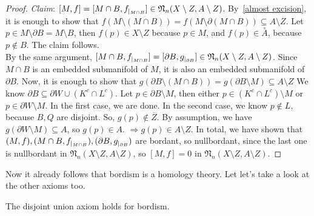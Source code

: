 \documentclass[a4paper,11pt]{article}
\begin{document}
\begin{proof}
    \textit{Claim}: \([M,f]=[M\cap B,f_{|_{M\cap B}}]\in\mathfrak{N}_n(X\setminus Z,A\setminus Z)\). By\ \ref{almost excision}, it is enough to show that \(f(M\setminus(M\cap B))=f(M\setminus \partial(M\cap B))\subseteq A\setminus Z\). Let \(p\in M\setminus\partial B=M\setminus B\), then \(f(p)\in X\setminus Z\) because \(p\in M\), and \(f(p)\in\overset{\circ}A\), because \(p\notin B\). The claim follows.\\
    By the same argument, \([M\cap B,f_{|_{M\cap B}}]=[\partial B,g_{|_{\partial B}}]\in\mathfrak{N}_n(X\setminus Z,A\setminus Z)\). Since \(M\cap B\) is an embedded submanifold of \(M\), it is also an embedded submanifold of \(\partial B\). Now, it is enough to show that \(g(\partial B\setminus(M\cap B))=g(\partial B\setminus M)\subseteq A\setminus Z\) We know \(\partial B\subseteq\partial W\cup(K^c\cap L^c)\). Let \(p\in\partial B\setminus M\), then either \(p\in(K^c\cap L^c)\setminus M\) or \(p\in\partial W\setminus M\). In the first case, we are done. In the second case, we know \(p\notin L\), because \(B,Q\) are disjoint. So, \(g(p)\notin\overline{Z}\). By assumption, we have \(g(\partial W\setminus M)\subseteq A\), so \(g(p)\in A\). \(\Rightarrow g(p)\in A\setminus Z\). In total, we have shown that \((M,f), (M\cap B,f_{|_{M\cap B}}), (\partial B,g_{|_{\partial B}})\) are bordant, so nullbordant, since the last one is nullbordant in \(\mathfrak{N}_n(X\setminus Z,A\setminus Z)\), so \([M,f]=0\) in \(\mathfrak N_n(X\setminus Z,A\setminus Z)\).
\end{proof}

Now it already follows that bordism is a homology theory. Let let's take a look at the other axioms too.

\begin{lemma}\label{disjoint union}
    The disjoint union axiom holds for bordism.
\end{lemma}
\end{document}
